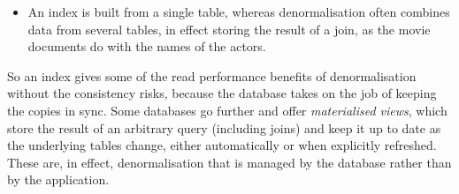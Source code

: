{\begin{itemize}
            Denormalised data usually copies whole fields, so that the read needs nothing else.
        \item An index is built from a single table, whereas denormalisation often combines data from several tables, in effect storing the result of a join, as the movie documents do with the names of the actors.
    \end{itemize}
    So an index gives some of the read performance benefits of denormalisation without the consistency risks, because the database takes on the job of keeping the copies in sync.
    Some databases go further and offer \emph{materialised views}, which store the result of an arbitrary query (including joins) and keep it up to date as the underlying tables change, either automatically or when explicitly refreshed.
    These are, in effect, denormalisation that is managed by the database rather than by the application.
}

